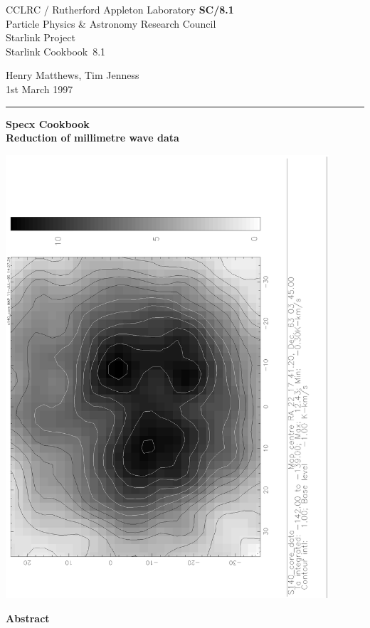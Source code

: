 \documentclass[11pt,twoside]{article}
\newcommand{\stardoccategory}  {Starlink Cookbook}
\newcommand{\stardocinitials}  {SC}
\newcommand{\stardocnumber}    {8.1}
\newcommand{\stardocauthors}   {Henry Matthews, Tim Jenness}
\newcommand{\stardocdate}      {1st March 1997}
\newcommand{\stardoctitle}     {Specx Cookbook \\[\latex{2ex}]
                                Reduction of millimetre wave data}
\newcommand{\stardocversion}   {[software-version]}
\newcommand{\stardocmanual}    {[manual-type]}
\newcommand{\stardocname}{\stardocinitials /\stardocnumber}
\newenvironment{latexonly}{}{}
\newcommand{\latex}[1]{#1}
\begin{document}
\thispagestyle{empty}

\begin{latexonly}
   CCLRC / {\sc Rutherford Appleton Laboratory} \hfill {\bf \stardocname}\\
   {\large Particle Physics \& Astronomy Research Council}\\
   {\large Starlink Project\\}
   {\large \stardoccategory\ \stardocnumber}
   \begin{flushright}
   \stardocauthors\\
   \stardocdate
   \end{flushright}
   \vspace{-4mm}
   \rule{\textwidth}{0.5mm}
   \vspace{5mm}
   \begin{center}
   {\Huge\bf  \stardoctitle \\ [2.5ex]}
   \end{center}
   \vspace{5mm}

   \begin{center}
   \includegraphics[angle=-90,width=120mm]{sc8_gray.ps}
   \end{center}


   \vspace{10mm}
   \begin{center}
      {\Large\bf Abstract}
   \end{center}
\end{latexonly}
\end{document}

